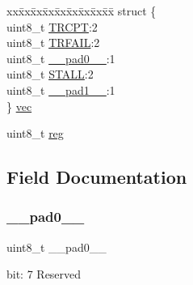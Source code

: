 \begin{DoxyCompactItemize}
\begin{tabbing}
\end{tabbing}\item 
\begin{tabbing}
xx\=xx\=xx\=xx\=xx\=xx\=xx\=xx\=xx\=\kill
struct \{\\
\>uint8\_t \mbox{\hyperlink{union_u_s_b___d_e_v_i_c_e___e_p_i_n_t_e_n_s_e_t___type_a483e1559fa2eff15864d13c2f6fd29ae}{TRCPT}}:2\\
\>uint8\_t \mbox{\hyperlink{union_u_s_b___d_e_v_i_c_e___e_p_i_n_t_e_n_s_e_t___type_a07aec3336bfd9ba5afd1e3ee3272fc96}{TRFAIL}}:2\\
\>uint8\_t \mbox{\hyperlink{union_u_s_b___d_e_v_i_c_e___e_p_i_n_t_e_n_s_e_t___type_a8b4eebe79ded0459acec2f4950102ba3}{\_\_pad0\_\_}}:1\\
\>uint8\_t \mbox{\hyperlink{union_u_s_b___d_e_v_i_c_e___e_p_i_n_t_e_n_s_e_t___type_a3115e3c453036179abec9286cab08407}{STALL}}:2\\
\>uint8\_t \mbox{\hyperlink{union_u_s_b___d_e_v_i_c_e___e_p_i_n_t_e_n_s_e_t___type_a77f12d2e278bd5c07712648ac0df5e08}{\_\_pad1\_\_}}:1\\
\} \mbox{\hyperlink{union_u_s_b___d_e_v_i_c_e___e_p_i_n_t_e_n_s_e_t___type_afdde63f46b3853285fb418957c29257b}{vec}}\\

\end{tabbing}\item 
uint8\+\_\+t \mbox{\hyperlink{union_u_s_b___d_e_v_i_c_e___e_p_i_n_t_e_n_s_e_t___type_a9428adc9af4653a2050e2536b55dec8d}{reg}}
\end{DoxyCompactItemize}


\subsection{Field Documentation}
\mbox{\label{union_u_s_b___d_e_v_i_c_e___e_p_i_n_t_e_n_s_e_t___type_a8b4eebe79ded0459acec2f4950102ba3}} 
\subsubsection{\texorpdfstring{\_\_pad0\_\_}{\_\_pad0\_\_}}
{\footnotesize\ttfamily uint8\+\_\+t \+\_\+\+\_\+pad0\+\_\+\+\_\+}

bit\+: 7 Reserved

